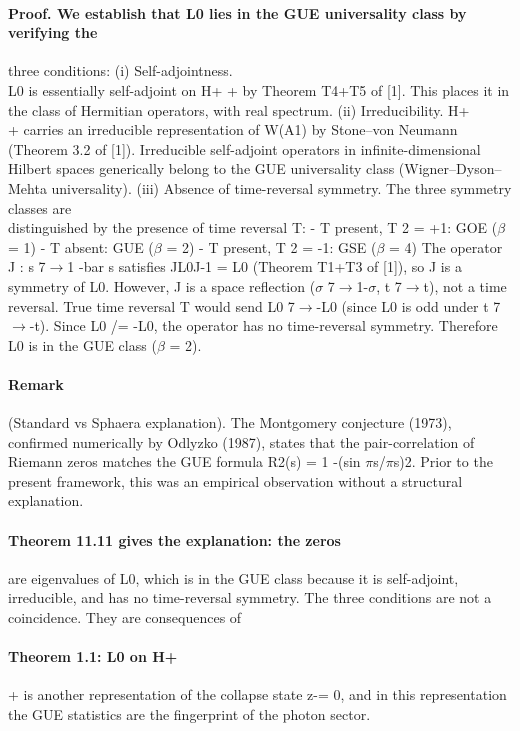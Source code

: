 \paragraph*{Proof. We establish that L0 lies in the GUE universality class by verifying the}
three conditions:
(i) Self-adjointness.\\
L0 is essentially self-adjoint on H+ + by Theorem T4+T5 of [1]. This places it in the class of Hermitian operators, with real spectrum.
(ii) Irreducibility. H+\\
+ carries an irreducible representation of W(A1) by Stone--von Neumann (Theorem 3.2 of [1]). Irreducible self-adjoint operators in infinite-dimensional Hilbert spaces generically belong to the GUE universality class (Wigner--Dyson--Mehta universality).
(iii) Absence of time-reversal symmetry. The three symmetry classes are\\
distinguished by the presence of time reversal T:
- T present, T 2 = +1: GOE ($\beta$ = 1)
- T absent: GUE ($\beta$ = 2)
- T present, T 2 = -1: GSE ($\beta$ = 4)
The operator J : s 7$\to$1 -bar s satisfies JL0J-1 = L0 (Theorem T1+T3 of [1]), so J is a symmetry of L0. However, J is a space reflection ($\sigma$ 7$\to$1-$\sigma$, t 7$\to$t), not a time reversal. True time reversal T would send L0 7$\to$-L0 (since L0 is odd under t 7$\to$-t). Since L0 /= -L0, the operator has no time-reversal symmetry. Therefore L0 is in the GUE class ($\beta$ = 2).
\paragraph*{Remark}
(Standard vs Sphaera explanation). The Montgomery conjecture (1973), confirmed numerically by Odlyzko (1987), states that the pair-correlation of Riemann zeros matches the GUE formula R2(s) = 1 -(sin $\pi$s/$\pi$s)2. Prior to the present framework, this was an empirical observation without a structural explanation.
\paragraph*{Theorem 11.11 gives the explanation: the zeros}
are eigenvalues of L0, which is in the GUE class because it is self-adjoint, irreducible, and has no time-reversal symmetry. The three conditions are not a coincidence. They are consequences of
\paragraph*{Theorem 1.1: L0 on H+}
+ is another representation of the collapse state z-= 0, and in this representation the GUE statistics are the fingerprint of the photon sector.

